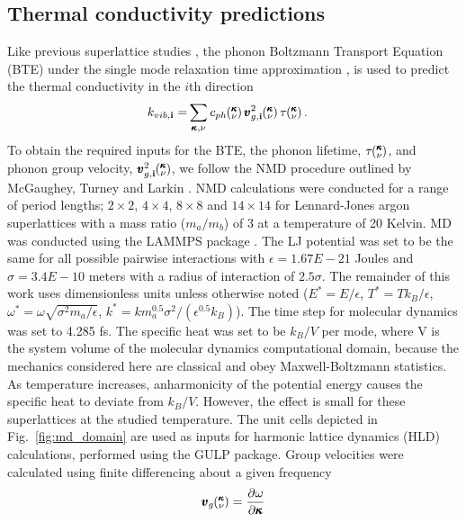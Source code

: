 \documentclass[aps,prb,preprint,preprintnumbers,amsmath,amssymb,floatfix,superscriptaddress]{revtex4}
\newcommand{\kv}{\mspace{-4.0mu}\left(\mspace{-8.0mu}
\begin{smallmatrix}&\pmb{\kappa} \\&\nu\end{smallmatrix}
\mspace{-3.0mu}\right)}
\begin{document}
\subsection{Thermal conductivity predictions}
Like previous superlattice studies \cite{Luckyanova16112012,doi:10.1021/nl202186y}, the phonon Boltzmann Transport Equation (BTE) under the single mode relaxation time approximation \cite{ziman_electrons_2001}, is used to predict the thermal conductivity in the $i$th direction
\begin{equation}\label{EQ:M:conductivity}
\begin{split}
k_{vib,\mathbf{i}}=&\sum_{\pmb{\kappa},\nu} c_{ph}\kv
\pmb{v}^{2}_{g,\mathbf{i}}\kv \tau\kv.
\end{split}
\end{equation}
To obtain the required inputs for the BTE, the phonon lifetime, $\tau\kv$, and phonon group velocity, $\pmb{v}^{2}_{g,\mathbf{i}}\kv$, we follow the NMD procedure outlined by McGaughey\cite{PhysRevB.71.184305}, Turney \cite {PhysRevB.81.081411} and Larkin \cite{jason_inpress}. NMD calculations were conducted for a range of period lengths; $2\times2$, $4\times4$, $8\times8$ and $14\times14$ for Lennard-Jones argon superlattices with a mass ratio ($m_a/m_b$) of 3 at a temperature of 20 Kelvin. MD was conducted using the LAMMPS package \cite{LAMMPS}. The LJ potential was set to be the same for all possible pairwise interactions with $\epsilon= 1.67E-21$ Joules and $\sigma= 3.4E-10$ meters with a radius of interaction of $2.5\sigma$. The remainder of this work uses dimensionless units unless otherwise noted ($E^*=E/\epsilon$, $T^*=Tk_B/\epsilon$, $\omega^*=\omega\sqrt{\sigma^2m_a/\epsilon}$, $k^*=km^{0.5}_a\sigma^2/(\epsilon^{0.5}k_B)$). The time step for molecular dynamics was set to 4.285 fs. The specific heat was set to be $k_B/V$ per mode, where V is the system volume of the molecular dynamics computational domain, because the mechanics considered here are classical and obey Maxwell-Boltzmann statistics. As temperature increases, anharmonicity of the potential energy causes the specific heat to deviate from $k_B/V$. However, the effect is small for these superlattices at the studied temperature\cite{jason_inpress}. The unit cells depicted in Fig.~\ref{fig:md_domain} are used as inputs for harmonic lattice dynamics (HLD) calculations, performed using the GULP package\cite{GULP}. Group velocities were calculated using finite differencing about a given frequency
\begin{equation}\label{EQ:NMD:vg}
\begin{split}
\pmb{v}_{g}\kv=\frac{\partial \omega}{\partial \pmb{\kappa}}
\end{split}
\end{equation}
\end{document}
